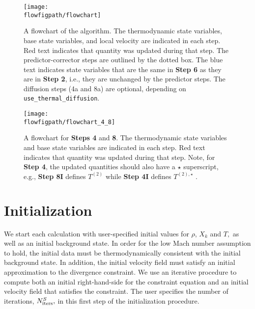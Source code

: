 \begin{figure}[tb]
\centering
\texttt{[image: \\flowfigpath/flowchart]}
\caption[Graphical flowchart of \maestro]
  {\label{Fig:flowchart} A flowchart of the algorithm.  The
  thermodynamic state variables, base state variables, and local velocity are
  indicated in each step.  Red text indicates that quantity was
  updated during that step.  The predictor-corrector steps are
  outlined by the dotted box.  The blue text indicates state
  variables that are the same in {\bf Step 6} as they are in
  {\bf Step 2}, i.e., they are unchanged by the predictor steps.
  The diffusion steps (4a and 8a) are optional, depending on
  {\tt use\_thermal\_diffusion}.}
\end{figure}
\begin{figure}[tb]                                               
\centering
\texttt{[image: \\flowfigpath/flowchart\_4\_8]}
\caption[Graphical flowchart of the density and enthalpy update steps]
{\label{Fig:flowchart48} A flowchart for {\bf Steps 4} and {\bf 8}.
  The thermodynamic state variables and base state variables are
  indicated in each step.  Red text indicates that quantity was
  updated during that step.  Note, for {\bf Step 4}, the updated
  quantities should also have a $\star$ superscript, e.g., {\bf Step
    8I} defines $T^{(2)}$ while {\bf Step 4I} defines $T^{(2),\star}$
  .}
\end{figure}



\section{Initialization}\label{Sec:Initialization}

\label{sec:flow:initialization}
 
We start each calculation with user-specified initial values for
$\rho$, $X_k$ and $T,$ as well as an initial background state.  In
order for the low Mach number assumption to hold, the initial data
must be thermodynamically consistent with the initial background
state.  In addition, the initial velocity field must satisfy an
initial approximation to the divergence constraint.  We use an iterative
procedure to compute both an initial right-hand-side for the
constraint equation and an initial velocity field that satisfies
the constraint.  The user specifies the number of iterations,
$N_{\rm iters}^{S},$ in this first step of the initialization procedure.


